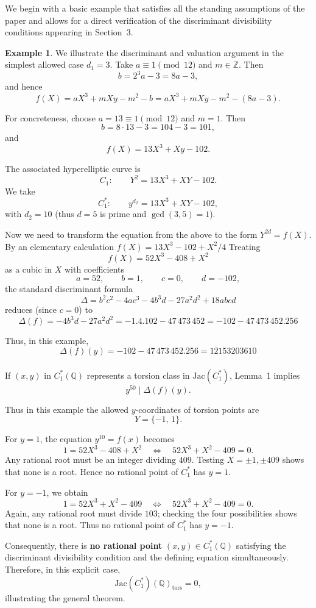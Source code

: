 \documentclass[12pt, reqno]{amsart}
\numberwithin{equation}{section}
\theoremstyle{definition}
\newtheorem{example}[thm]{Example}
\theoremstyle{nodefstyle}
\begin{document}
We begin with a basic example that satisfies all the standing assumptions of the paper
and allows for a direct verification of the discriminant divisibility conditions
appearing in Section~3.
\begin{example}\label{ex:torsion-1}
We illustrate the discriminant and valuation argument in the simplest allowed case
\(d_1 = 3\).
Take \(a\equiv 1 \pmod{12}\) and \(m\in\mathbb Z\). Then
\[
b = 2^{3} a - 3 = 8a - 3,
\]
and hence
\[
f(X)
= a X^3 + m X y - m^2 - b
= a X^3 + m X y - m^2 - (8a - 3).
\]

For concreteness, choose \(a = 13\equiv 1\pmod{12}\) and \(m=1\). Then
\[
b = 8\cdot 13 - 3 = 104 - 3 = 101,
\]
and
\[
f(X) = 13X^3 + Xy - 102.
\]

The associated hyperelliptic curve is
\[
C_1:\qquad Y^2 = 13X^3 + XY - 102.
\]
We take
\[
C_1^*:\qquad y^{d_2} = 13X^3 + XY - 102,
\]
with \(d_2 = 10\) (thus \(d = 5\) is prime and \(\gcd(3,5)=1\)).

Now we need to transform the equation from the above to the form $Y^{2d}=f(X)$. By an elementary calculation $f(X)=13X^3-102+X^2/4$
Treating
\[
f(X) = 52X^3 -408+X^2
\]
as a cubic in \(X\) with coefficients
\[
a=52,\qquad b=1,\qquad c=0,\qquad d=-102,
\]
the standard discriminant formula
\[
\Delta = b^2c^2 - 4ac^3 - 4b^3d - 27a^2d^2 + 18abcd
\]
reduces (since \(c=0\)) to
\[
\Delta(f)
= -4b^3d - 27a^2 d^2
= -1.4.102 - 47\,473\,452
= -102-47\,473\,452.256
\]

Thus, in this example,
\[
\Delta(f)(y) = -102-47\,473\,452.256=12153203610
\]
\\
If $(x,y)$ in $ C_1^*(\mathbb Q)$ represents a torsion class in 
\(\mathrm{Jac}(C_1^*)\),
Lemma~1 implies
\[
y^{50} \mid \Delta(f)(y).
\]

Thus in this example the allowed \(y\)-coordinates of torsion points are
\[
Y = \{-1,\,1\}.
\]

For \(y=1\), the equation \(y^{10}=f(x)\) becomes
\[
1 = 52X^3 -408+X^2
\quad\Longleftrightarrow\quad
52X^3 + X^2 - 409 = 0.
\]
Any rational root must be an integer dividing \(409\).  
Testing \(X = \pm 1, \pm 409\) shows that none is a root.
Hence no rational point of \(C_1^*\) has \(y = 1\).

For \(y = -1\), we obtain
\[
1 = 52X^3 + X^2 - 409
\quad\Longleftrightarrow\quad
52X^3 + X^2 - 409 = 0.
\]
Again, any rational root must divide \(103\); checking the four possibilities shows that none is a root.  
Thus no rational point of \(C_1^*\) has \(y=-1\).

\medskip

\noindent
Consequently, there is \textbf{no rational point} \((x,y)\in C_1^*(\mathbb Q)\) satisfying the discriminant divisibility condition and the defining equation simultaneously. Therefore, in this explicit case,
\[
\mathrm{Jac}(C_1^*)(\mathbb Q)_{\mathrm{tors}} = 0,
\]
illustrating the general theorem.
\end{example}
\end{document}
